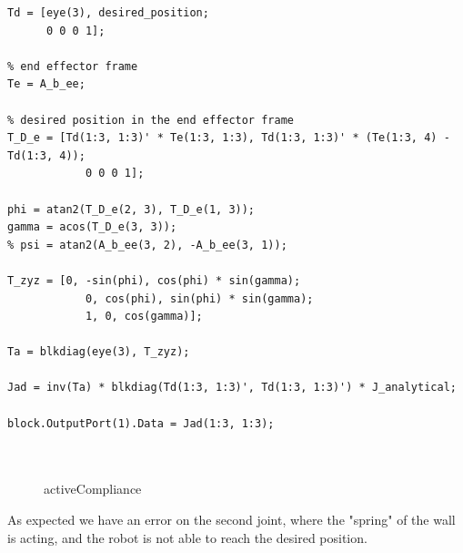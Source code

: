 \documentclass{article}
\begin{document}
\begin{lstlisting}[style=Matlab-editor]
Td = [eye(3), desired_position; 
      0 0 0 1];

% end effector frame
Te = A_b_ee;

% desired position in the end effector frame
T_D_e = [Td(1:3, 1:3)' * Te(1:3, 1:3), Td(1:3, 1:3)' * (Te(1:3, 4) - Td(1:3, 4));
            0 0 0 1];

phi = atan2(T_D_e(2, 3), T_D_e(1, 3));
gamma = acos(T_D_e(3, 3));
% psi = atan2(A_b_ee(3, 2), -A_b_ee(3, 1));

T_zyz = [0, -sin(phi), cos(phi) * sin(gamma);
            0, cos(phi), sin(phi) * sin(gamma);
            1, 0, cos(gamma)];

Ta = blkdiag(eye(3), T_zyz);

Jad = inv(Ta) * blkdiag(Td(1:3, 1:3)', Td(1:3, 1:3)') * J_analytical;

block.OutputPort(1).Data = Jad(1:3, 1:3);



\end{lstlisting}



\begin{figure}[H]
    \centering
    \caption{activeCompliance}
    \label{fig:activeCompliance}
\end{figure}

As expected we have an error on the second joint, where the "spring" of the wall is acting, and the robot is not able to reach the desired position.
\end{document}
